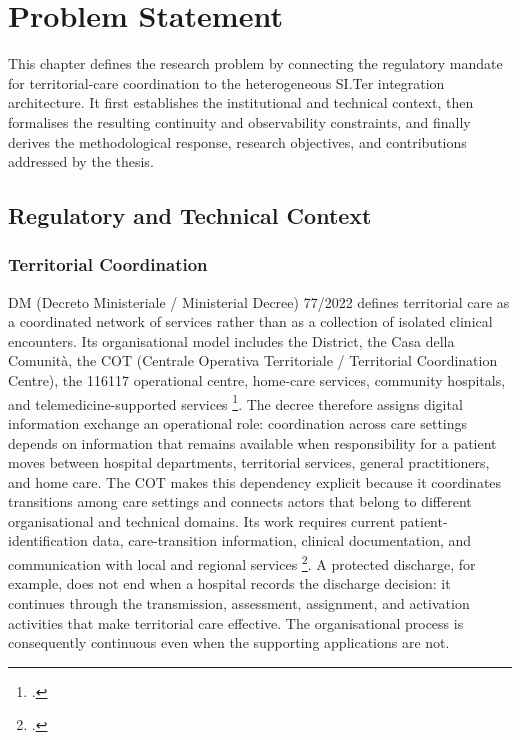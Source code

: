 \chapter{Problem Statement}
\label{chap:introduction}

\begingroup
\setlength{\emergencystretch}{2em}
\noindent This chapter defines the research problem by connecting the regulatory
mandate for territorial-care coordination to the heterogeneous SI.Ter
integration architecture. It first establishes the institutional and technical
context, then formalises the resulting continuity and observability constraints,
and finally derives the methodological response, research objectives, and
contributions addressed by the thesis.

\section{Regulatory and Technical Context}
\label{sec:regulatory-technical-context}

\subsection{Territorial Coordination}
\label{chap:domain}
\label{sec:territorial-regulatory}

\noindent DM (Decreto Ministeriale / Ministerial Decree) 77/2022 defines territorial care as a
coordinated network of services rather than as a collection of isolated clinical
encounters. Its organisational model includes the District, the Casa della
Comunità, the COT (Centrale Operativa Territoriale / Territorial Coordination
Centre), the 116117 operational
centre, home-care services, community hospitals, and telemedicine-supported
services \footcite[Allegato~1, pp.~12, 20--21]{dm-77-2022}. The decree therefore
assigns digital information exchange an operational role: coordination across
care settings depends on information that remains available when responsibility
for a patient moves between hospital departments, territorial services, general
practitioners, and home care. The COT makes this dependency explicit because it coordinates transitions among
care settings and connects actors that belong to different organisational and
technical domains. Its work requires current patient-identification data,
care-transition information, clinical documentation, and communication with
local and regional services \footcite[Allegato~1,
pp.~20--21]{dm-77-2022}. A protected discharge, for example, does not end when a
hospital records the discharge decision: it continues through the transmission,
assessment, assignment, and activation activities that make territorial care
effective. The organisational process is consequently continuous even when the
supporting applications are not.

